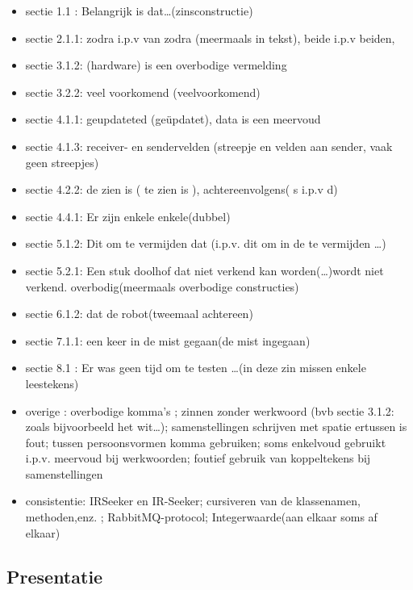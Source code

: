 \documentclass[12pt,a4paper]{report}
\begin{document}
\begin{itemize}
	\item sectie 1.1  : Belangrijk is dat\ldots (zinsconstructie)
	\item sectie 2.1.1: zodra i.p.v van zodra (meermaals in tekst), beide i.p.v beiden,
	\item sectie 3.1.2: (hardware) is een overbodige vermelding  
	\item sectie 3.2.2: veel voorkomend (veelvoorkomend)
	\item sectie 4.1.1: geupdateted (ge\"updatet), data is een meervoud
	\item sectie 4.1.3: receiver- en sendervelden (streepje en velden aan sender, vaak geen streepjes)
	\item sectie 4.2.2: de zien is  (  te zien is ), achtereenvolgens( s i.p.v d)
	\item sectie 4.4.1: Er zijn enkele enkele(dubbel)
	\item sectie 5.1.2: Dit om te vermijden dat (i.p.v. dit om in de te vermijden \ldots)
	\item sectie 5.2.1: Een stuk doolhof dat niet verkend kan worden(\ldots)wordt niet verkend. overbodig(meermaals overbodige constructies)
	\item sectie 6.1.2: dat de robot(tweemaal achtereen)
	\item sectie 7.1.1: een keer in de mist gegaan(de mist ingegaan)
	\item sectie 8.1  : Er was geen tijd om te testen \ldots (in deze zin missen enkele leestekens)
	\item overige     : overbodige komma's ; zinnen zonder werkwoord (bvb sectie 3.1.2: zoals bijvoorbeeld het wit\ldots); samenstellingen schrijven met spatie ertussen is fout; tussen persoonsvormen komma gebruiken;  soms enkelvoud gebruikt i.p.v. meervoud bij werkwoorden; foutief gebruik van koppeltekens bij samenstellingen
	\item consistentie: IRSeeker en IR-Seeker; cursiveren van de klassenamen, methoden,enz. ; RabbitMQ-protocol; Integerwaarde(aan elkaar soms af elkaar)
\end{itemize}

\subsection{Presentatie}
\end{document}
